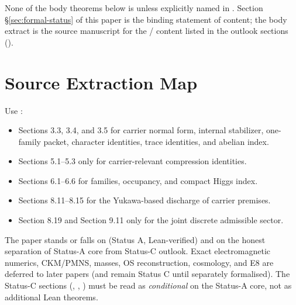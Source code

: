 \documentclass[11pt,a4paper]{article}
\begin{document}
\begin{tfptwarningbox}
\smallskip
None of the body theorems below is  unless explicitly
named in . Section
\S\ref{sec:formal-status} of this paper is the binding
statement of  content; the body extract is the source
manuscript for the  /  content listed in the
 outlook sections
().
\end{tfptwarningbox}

\tfptDraftXrefNotice



\section{Source Extraction Map}

\begin{tfptsourcebox}
Use \sourceDraft:
\begin{itemize}[leftmargin=1.5em]
    \item Sections 3.3, 3.4, and 3.5 for carrier normal form, internal stabilizer, one-family
    packet, character identities, trace identities, and abelian index.
    \item Sections 5.1--5.3 only for carrier-relevant compression identities.
    \item Sections 6.1--6.6 for families, occupancy, and compact Higgs index.
    \item Sections 8.11--8.15 for the Yukawa-based discharge of carrier premises.
    \item Section 8.19 and Section 9.11 only for the joint discrete admissible sector.
\end{itemize}
\end{tfptsourcebox}

\begin{tfptwarningbox}
The paper stands or falls on  (Status A, Lean-verified) and on the
honest separation of Status-A core from Status-C outlook. Exact electromagnetic numerics,
CKM/PMNS, masses, OS reconstruction, cosmology, and E8 are deferred to later papers (and remain
Status C until separately formalised). The Status-C sections (,
, ) must be read as
\emph{conditional} on the Status-A core, not as additional Lean theorems.
\end{tfptwarningbox}
\end{document}
